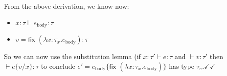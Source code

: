 \documentclass[10pt, oneside]{article}
\begin{document}
\begin{enumerate}
\begin{enumerate}
\begin{prooftree}
			
		\end{prooftree}
		
		From the above derivation, we know now:
		\begin{itemize}
			\item $x: \tau \vdash e_\text{body} :  \tau$
			\item $v = \textsf{fix } (\lambda x: \tau_x.e_\text{body}): \tau$
		\end{itemize}
		
		So we can now use the substitution lemma (if $x:\tau' \vdash e:\tau$ and 
		$\vdash v:\tau'$ then $\vdash e\{v/x\}: \tau$ to conclude $e' = e_\text{body} 
		\{\textsf{fix } (\lambda x: \tau_x.e_\text{body}) \}$ has type $\tau_e. 
		\checkmark \checkmark$
		
	\end{enumerate}
\end{enumerate}
\end{document}
